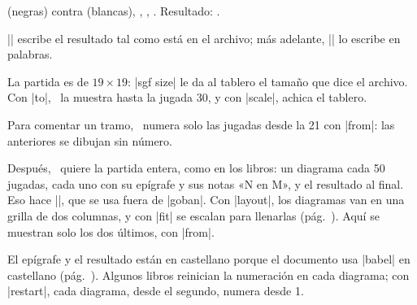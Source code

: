 \begin{goban}
 (negras) contra  (blancas),
, , .
Resultado: .

|\sgfinfo| escribe el resultado tal como está en el archivo; más adelante, |\sgfdiagrams| lo escribe en palabras.

La partida es de $19\times19$: |sgf size| le da al tablero el tamaño que dice el archivo. Con |to|, \karu\ la muestra hasta la jugada 30, y con |scale|, achica el tablero.

\begin{codeexample}[]
	\begin{goban}[sgf size = lee, captures, scale = 0.6]
	\end{goban}
\end{codeexample}

Para comentar un tramo, \karu\ numera solo las jugadas desde la 21 con |from|: las anteriores se dibujan sin número.

\begin{codeexample}[]
	\begin{goban}[sgf size = lee, captures, scale = 0.6]
	\end{goban}
\end{codeexample}

Después, \karu\ quiere la partida entera, como en los libros: un diagrama cada 50 jugadas, cada uno con su epígrafe y sus notas «N en M», y el resultado al final. Eso hace |\sgfdiagrams|, que se usa fuera de |goban|. Con |layout|, los diagramas van en una grilla de dos columnas, y con |fit| se escalan para llenarlas (pág.~\pageref{subsec:disposicion}). Aquí se muestran solo los dos últimos, con |from|.

\begin{codeexample}
\end{codeexample}


El epígrafe y el resultado están en castellano porque el documento usa |babel| en castellano (pág.~\pageref{subsec:idiomas}). Algunos libros reinician la numeración en cada diagrama; con |restart|, cada diagrama, desde el segundo, numera desde 1.

\begin{codeexample}
\end{codeexample}


\end{goban}
